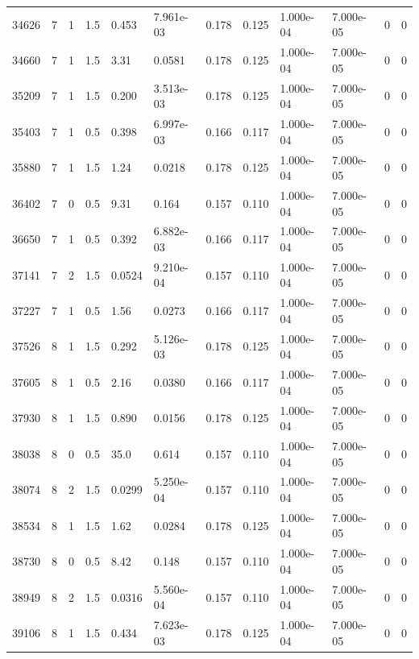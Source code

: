 \documentclass[preview]{standalone}
\begin{document}
{{{\begin{tabular}{L{1.2cm}C{1.2cm} C{0.3cm}C{0.5cm} C{1.4cm}C{1.4cm} C{1.4cm}C{1.4cm} C{1.6cm}C{1.6cm} C{1.6cm}C{1.6cm}}
  34626  &     7  & 1     & 1.5 &  0.453  & 7.961e-03  &  0.178&   0.125& 1.000e-04 & 7.000e-05   &  0 & 0  \\ 
  34660  &     7  & 1     & 1.5 &  3.31  & 0.0581  &  0.178&   0.125& 1.000e-04 & 7.000e-05   &  0 & 0  \\ 
  35209  &     7  & 1     & 1.5 &  0.200  & 3.513e-03  &  0.178&   0.125& 1.000e-04 & 7.000e-05   &  0 & 0  \\ 
  35403  &     7  & 1     & 0.5 &  0.398  & 6.997e-03  &  0.166&   0.117& 1.000e-04 & 7.000e-05   &  0 & 0  \\ 
  35880  &     7  & 1     & 1.5 &  1.24  & 0.0218  &  0.178&   0.125& 1.000e-04 & 7.000e-05   &  0 & 0  \\ 
  36402  &     7  & 0     & 0.5 &  9.31  & 0.164  &  0.157&   0.110& 1.000e-04 & 7.000e-05   &  0 & 0  \\ 
  36650  &     7  & 1     & 0.5 &  0.392  & 6.882e-03  &  0.166&   0.117& 1.000e-04 & 7.000e-05   &  0 & 0  \\ 
  37141  &     7  & 2     & 1.5 &  0.0524  & 9.210e-04  &  0.157&   0.110& 1.000e-04 & 7.000e-05   &  0 & 0  \\ 
  37227  &     7  & 1     & 0.5 &  1.56  & 0.0273  &  0.166&   0.117& 1.000e-04 & 7.000e-05   &  0 & 0  \\ 
  37526  &     8  & 1     & 1.5 &  0.292  & 5.126e-03  &  0.178&   0.125& 1.000e-04 & 7.000e-05   &  0 & 0  \\ 
  37605  &     8  & 1     & 0.5 &  2.16  & 0.0380  &  0.166&   0.117& 1.000e-04 & 7.000e-05   &  0 & 0  \\ 
  37930  &     8  & 1     & 1.5 &  0.890  & 0.0156  &  0.178&   0.125& 1.000e-04 & 7.000e-05   &  0 & 0  \\ 
  38038  &     8  & 0     & 0.5 &  35.0  & 0.614  &  0.157&   0.110& 1.000e-04 & 7.000e-05   &  0 & 0  \\ 
  38074  &     8  & 2     & 1.5 &  0.0299  & 5.250e-04  &  0.157&   0.110& 1.000e-04 & 7.000e-05   &  0 & 0  \\ 
  38534  &     8  & 1     & 1.5 &  1.62  & 0.0284  &  0.178&   0.125& 1.000e-04 & 7.000e-05   &  0 & 0  \\ 
  38730  &     8  & 0     & 0.5 &  8.42  & 0.148  &  0.157&   0.110& 1.000e-04 & 7.000e-05   &  0 & 0  \\ 
  38949  &     8  & 2     & 1.5 &  0.0316  & 5.560e-04  &  0.157&   0.110& 1.000e-04 & 7.000e-05   &  0 & 0  \\ 
  39106  &     8  & 1     & 1.5 &  0.434  & 7.623e-03  &  0.178&   0.125& 1.000e-04 & 7.000e-05   &  0 & 0  \\ 

\end{tabular}}}}
\end{document}
